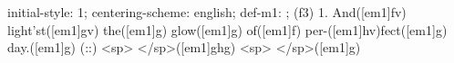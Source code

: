 initial-style: 1;
centering-scheme: english;
def-m1: \grealign;
(f3) 1. And([em1]fv) light'st([em1]gv) the([em1]g) glow([em1]g) of([em1]f) per-([em1]hv)fect([em1]g) day.([em1]g) (::) <sp> </sp>([em1]ghg) <sp> </sp>([em1]g)